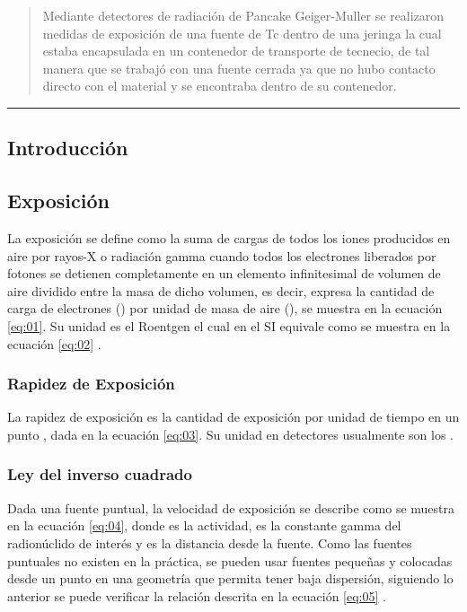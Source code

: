 \begin{abstract}
  Mediante detectores de radiación de Pancake Geiger-Muller se realizaron medidas de exposición  de una fuente de Tc dentro de una jeringa la cual estaba encapsulada en un contenedor de transporte de tecnecio, de tal manera que se trabajó con una fuente cerrada ya que no hubo contacto directo con el material y se encontraba dentro de su contenedor.
\end{abstract}
\hrule
\begin{multicols}{2}


  \section{Introducción}
  \subsection*{Exposición \texorpdfstring{}{TEXT}}

  La exposición se define como la suma de cargas de todos los iones producidos en aire por rayos-X o radiación gamma cuando todos los electrones liberados por fotones se detienen completamente en un elemento infinitesimal de volumen de aire  dividido entre la masa de dicho volumen, es decir, expresa la cantidad de carga de electrones () por unidad de masa de aire (), se muestra en la ecuación \ref{eq:01}. Su unidad es el Roentgen el cual en el SI equivale como se muestra en la ecuación \ref{eq:02} \citep{conceptos1}.
  \subsubsection*{Rapidez de Exposición \texorpdfstring{}{TEXT}}

  La rapidez de exposición es la cantidad de exposición por unidad de tiempo en un punto , dada en la ecuación \ref{eq:03}. Su unidad en detectores usualmente son los  \citep{attix}.


  \subsubsection*{Ley del inverso cuadrado}

  Dada una fuente puntual, la velocidad de exposición se describe como se muestra en la ecuación \ref{eq:04}, donde  es la actividad, \ec{\Gamma} es la constante gamma del radionúclido de interés y  es la distancia desde la fuente.  Como las fuentes puntuales no existen en la práctica, se pueden usar fuentes pequeñas y colocadas desde un punto en una geometría que permita tener baja dispersión, siguiendo lo anterior se puede verificar la relación descrita en la ecuación \ref{eq:05}   \citep{conceptos1}. 





\end{multicols}
